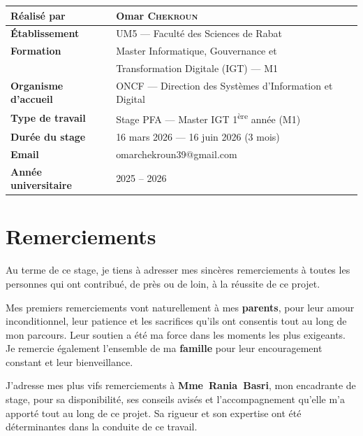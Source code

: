 \documentclass[12pt, a4paper]{report}
\begin{document}
\begin{titlepage}
\begin{center}
\begin{tabular}{|l|l|}
\hline
\textbf{Réalisé par}        & Omar \textsc{Chekroun} \\
\hline
\textbf{Établissement}      & UM5 --- Faculté des Sciences de Rabat \\
\hline
\textbf{Formation}          & Master Informatique, Gouvernance et \\
                            & Transformation Digitale (IGT) --- M1 \\
\hline
\textbf{Organisme d'accueil}& ONCF --- Direction des Systèmes d'Information et Digital \\
\hline
\textbf{Type de travail}    & Stage PFA --- Master IGT 1\textsuperscript{ère} année (M1) \\
\hline
\textbf{Durée du stage}     & 16 mars 2026 --- 16 juin 2026 (3 mois) \\
\hline
\textbf{Email}              & omarchekroun39@gmail.com \\
\hline
\textbf{Année universitaire}& 2025 -- 2026 \\
\hline
\end{tabular}

\vfill

\end{center}
\end{titlepage}

\newpage
\chapter*{Remerciements}

Au terme de ce stage, je tiens à adresser mes sincères remerciements à
toutes les personnes qui ont contribué, de près ou de loin, à la réussite
de ce projet.

Mes premiers remerciements vont naturellement à mes \textbf{parents}, pour
leur amour inconditionnel, leur patience et les sacrifices qu'ils ont
consentis tout au long de mon parcours. Leur soutien a été ma force dans
les moments les plus exigeants. Je remercie également l'ensemble de ma
\textbf{famille} pour leur encouragement constant et leur bienveillance.

J'adresse mes plus vifs remerciements à \textbf{Mme~Rania~Basri}, mon
encadrante de stage, pour sa disponibilité, ses conseils avisés et
l'accompagnement qu'elle m'a apporté tout au long de ce projet. Sa
rigueur et son expertise ont été déterminantes dans la conduite de ce
travail.
\end{document}
